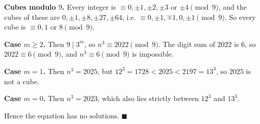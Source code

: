 \textbf{Cubes modulo $9$.} Every integer is $\equiv0,\pm1,\pm2,\pm3$ or $\pm4\pmod9$, and the cubes of these are $0,\pm1,\pm8,\pm27,\pm64$, i.e. $\equiv0,\pm1,\mp1,0,\pm1\pmod 9$. So every cube is $\equiv0,1$ or $8\pmod9$.

\textbf{Case $m\ge2$.} Then $9\mid3^m$, so $n^3\equiv2022\pmod9$. The digit sum of $2022$ is $6$, so $2022\equiv6\pmod9$, and $n^3\equiv6\pmod9$ is impossible.

\textbf{Case $m=1$.} Then $n^3=2025$, but $12^3=1728<2025<2197=13^3$, so $2025$ is not a cube.

\textbf{Case $m=0$.} Then $n^3=2023$, which also lies strictly between $12^3$ and $13^3$.

Hence the equation has $\boxed{\text{no solutions}}$. $\blacksquare$
